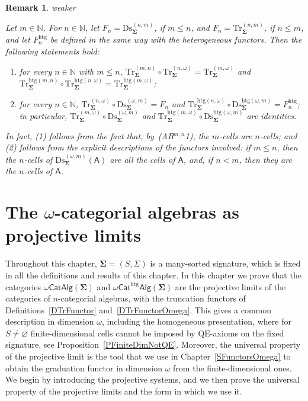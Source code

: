 \documentclass[a4paper, reqno]{amsbook}
\makeatletter
\newcommand{\sig}[1]{\mathbf{#1}}             %
\newcommand{\calg}[1]{\boldsymbol{\mathsf{#1}}} %
\newcommand{\QE}{\mathrm{QE}}
\newcommand{\htg}{\mathrm{htg}}                %
\newcommand{\Ds}{\mathrm{Ds}}
\newcommand{\Tr}{\mathrm{Tr}}
\theoremstyle{plain}
\newtheorem{remark}[theorem]{Remark}
\theoremstyle{definition}
\newcommand*{\CA@leanpending}{}
\newcommand*{\CA@leanrelation}{}
\newcommand*{\lean}[2]{%
  \ifcsname\string\color@lean@#1\endcsname\else
    \PackageError{main}{Unknown relation `#1' in \string\lean}{Use equivalent, weaker or stronger.}%
  \fi
  \gdef\CA@leanrelation{#1}%
  \gdef\CA@leanpending{#2}}
\makeatother
\begin{document}
\begin{remark}\label{RDsTrCompOmega}\lean{weaker}{Dimensions.homogeneousOmegaTruncationFunctorComp,Dimensions.heterogeneousOmegaTruncationFunctorComp,Dimensions.homogeneousOmegaMixedUpperFunctor,Dimensions.heterogeneousOmegaMixedUpperFunctor,Dimensions.homogeneousOmegaMixedLowerFunctor,Dimensions.heterogeneousOmegaMixedLowerFunctor}
Let $m\in\mathbb{N}$.
For $n\in\mathbb{N}$, let $F_{n}=\Ds^{(n,m)}_{\sig{\Sigma}}$, if $m\leq n$, and $F_{n}=\Tr^{(n,m)}_{\sig{\Sigma}}$, if $n\leq m$, and let $F^{\htg}_{n}$ be defined in the same way with the heterogeneous functors.
Then the following statements hold:
\begin{enumerate}
\item for every $n\in\mathbb{N}$ with $m\leq n$, $\Tr^{(m,n)}_{\sig{\Sigma}}\circ\Tr^{(n,\omega)}_{\sig{\Sigma}}=\Tr^{(m,\omega)}_{\sig{\Sigma}}$ and $\Tr^{\htg(m,n)}_{\sig{\Sigma}}\circ\Tr^{\htg(n,\omega)}_{\sig{\Sigma}}=\Tr^{\htg(m,\omega)}_{\sig{\Sigma}}$;
\item for every $n\in\mathbb{N}$, $\Tr^{(n,\omega)}_{\sig{\Sigma}}\circ\Ds^{(\omega,m)}_{\sig{\Sigma}}=F_{n}$ and $\Tr^{\htg(n,\omega)}_{\sig{\Sigma}}\circ\Ds^{\htg(\omega,m)}_{\sig{\Sigma}}=F^{\htg}_{n}$; in particular, $\Tr^{(m,\omega)}_{\sig{\Sigma}}\circ\Ds^{(\omega,m)}_{\sig{\Sigma}}$ and $\Tr^{\htg(m,\omega)}_{\sig{\Sigma}}\circ\Ds^{\htg(\omega,m)}_{\sig{\Sigma}}$ are identities.
\end{enumerate}
In fact, (1) follows from the fact that, by~(AB$^{m,n}$1), the $m$-cells are $n$-cells; and (2) follows from the explicit descriptions of the functors involved: if $m\leq n$, then the $n$-cells of $\Ds^{(\omega,m)}_{\sig{\Sigma}}(\calg{A})$ are all the cells of $\calg{A}$, and, if $n<m$, then they are the $n$-cells of $\calg{A}$.
\end{remark}

\chapter{The \texorpdfstring{$\omega$}{omega}-categorial algebras as projective limits}\label{SProjLimits}

Throughout this chapter, $\sig{\Sigma}=(S,\Sigma)$ is a many-sorted signature, which is fixed in all the definitions and results of this chapter.
In this chapter we prove that the categories $\omega\mathsf{CatAlg}(\sig{\Sigma})$ and $\omega\mathsf{Cat}^{\htg}\mathsf{Alg}(\sig{\Sigma})$ are the projective limits of the categories of $n$-categorial algebras, with the truncation functors of Definitions~\ref{DTrFunctor} and~\ref{DTrFunctorOmega}.
This gives a common description in dimension $\omega$, including the homogeneous presentation, where for $S\neq\varnothing$ finite-dimensional cells cannot be imposed by $\QE$-axioms on the fixed signature, see Proposition~\ref{PFiniteDimNotQE}.
Moreover, the universal property of the projective limit is the tool that we use in Chapter~\ref{SFunctorsOmega} to obtain the graduation functor in dimension $\omega$ from the finite-dimensional ones.
We begin by introducing the projective systems, and we then prove the universal property of the projective limits and the form in which we use it.
\end{document}
